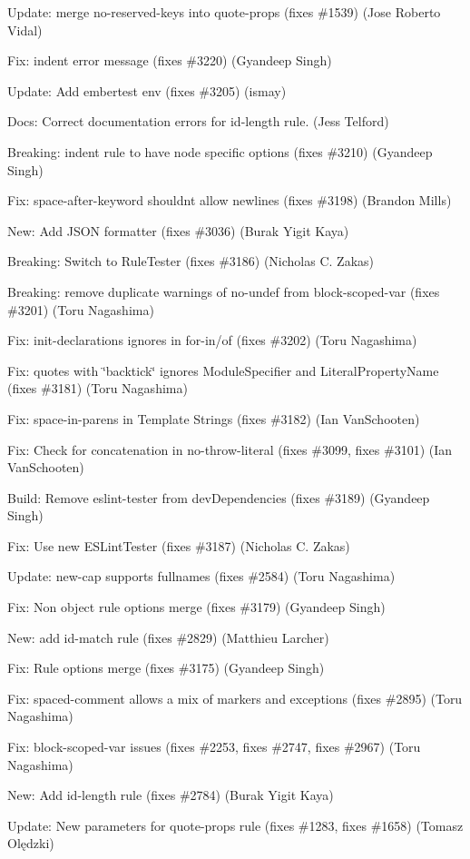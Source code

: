 \begin{DoxyItemize}
\item Update\+: merge {\ttfamily no-\/reserved-\/keys} into {\ttfamily quote-\/props} (fixes \#1539) (Jose Roberto Vidal)
\item Fix\+: {\ttfamily indent} error message (fixes \#3220) (Gyandeep Singh)
\item Update\+: Add embertest env (fixes \#3205) (ismay)
\item Docs\+: Correct documentation errors for {\ttfamily id-\/length} rule. (Jess Telford)
\item Breaking\+: {\ttfamily indent} rule to have node specific options (fixes \#3210) (Gyandeep Singh)
\item Fix\+: space-\/after-\/keyword shouldn\textquotesingle{}t allow newlines (fixes \#3198) (Brandon Mills)
\item New\+: Add J\+S\+ON formatter (fixes \#3036) (Burak Yigit Kaya)
\item Breaking\+: Switch to Rule\+Tester (fixes \#3186) (Nicholas C. Zakas)
\item Breaking\+: remove duplicate warnings of {\ttfamily no-\/undef} from {\ttfamily block-\/scoped-\/var} (fixes \#3201) (Toru Nagashima)
\item Fix\+: {\ttfamily init-\/declarations} ignores in for-\/in/of (fixes \#3202) (Toru Nagashima)
\item Fix\+: {\ttfamily quotes} with {\ttfamily \char`\"{}backtick\char`\"{}} ignores Module\+Specifier and Literal\+Property\+Name (fixes \#3181) (Toru Nagashima)
\item Fix\+: space-\/in-\/parens in Template Strings (fixes \#3182) (Ian Van\+Schooten)
\item Fix\+: Check for concatenation in no-\/throw-\/literal (fixes \#3099, fixes \#3101) (Ian Van\+Schooten)
\item Build\+: Remove {\ttfamily eslint-\/tester} from dev\+Dependencies (fixes \#3189) (Gyandeep Singh)
\item Fix\+: Use new E\+S\+Lint\+Tester (fixes \#3187) (Nicholas C. Zakas)
\item Update\+: {\ttfamily new-\/cap} supports fullnames (fixes \#2584) (Toru Nagashima)
\item Fix\+: Non object rule options merge (fixes \#3179) (Gyandeep Singh)
\item New\+: add id-\/match rule (fixes \#2829) (Matthieu Larcher)
\item Fix\+: Rule options merge (fixes \#3175) (Gyandeep Singh)
\item Fix\+: {\ttfamily spaced-\/comment} allows a mix of markers and exceptions (fixes \#2895) (Toru Nagashima)
\item Fix\+: {\ttfamily block-\/scoped-\/var} issues (fixes \#2253, fixes \#2747, fixes \#2967) (Toru Nagashima)
\item New\+: Add id-\/length rule (fixes \#2784) (Burak Yigit Kaya)
\item Update\+: New parameters for quote-\/props rule (fixes \#1283, fixes \#1658) (Tomasz Olędzki)
\end{DoxyItemize}

